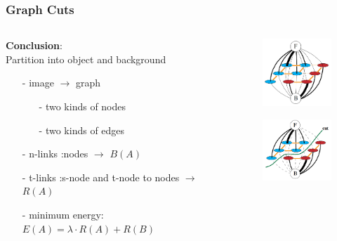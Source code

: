 \documentclass[notheorems,mathserif,table,compress]{beamer}  %
\begin{document}
\begin{frame}
\frametitle{Graph Cuts}
\begin{columns}
    \begin{column}[c]{0.5\textwidth}
    \textbf{Conclusion}:\\
     Partition into object and background
    \begin{itemize}
     \item[-] image $\rightarrow$ graph
	  \begin{itemize}
	  \item[-] two kinds of nodes	
	  \item[-] two kinds of edges	
	  \end{itemize}
     \item[-] n-links :nodes $\rightarrow$  $B(A)$
     \item[-] t-links :s-node and t-node to nodes $\rightarrow$ $R(A)$
     \item[-] minimum energy: $E(A)=\lambda \cdot R(A) + R(B)$ 
     \end{itemize}
   \end{column}
   
   \begin{column}[c]{0.5\textwidth}
       \begin{figure}[!ht]
       \centering
       \includegraphics[width=1.2in]{graphcut1.png}
       \end{figure}
       \begin{figure}[!ht]
       \centering
       \includegraphics[width=1.2in]{graphcut2.png}
       \end{figure}
      \end{column}
 \end{columns}  
\end{frame}
\end{document}
